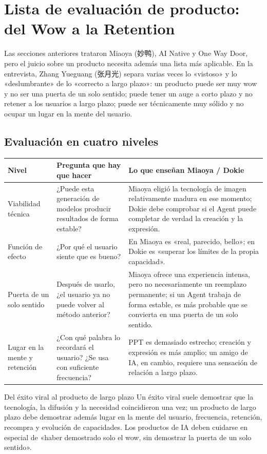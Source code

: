 \section{Lista de evaluación de producto: del Wow a la Retention}

Las secciones anteriores trataron Miaoya (妙鸭), AI Native y One Way Door, pero el juicio sobre un producto necesita además una lista más aplicable. En la entrevista, Zhang Yueguang (张月光) separa varias veces lo «vistoso» y lo «deslumbrante» de lo «correcto a largo plazo»: un producto puede ser muy wow y no ser una puerta de un solo sentido; puede tener un auge a corto plazo y no retener a los usuarios a largo plazo; puede ser técnicamente muy sólido y no ocupar un lugar en la mente del usuario.

\subsection{Evaluación en cuatro niveles}

\begin{longtable}{p{}p{}p{}}
\toprule
Nivel & Pregunta que hay que hacer & Lo que enseñan Miaoya / Dokie \\
\midrule
Viabilidad técnica & ¿Puede esta generación de modelos producir resultados de forma estable? & Miaoya eligió la tecnología de imagen relativamente madura en ese momento; Dokie debe comprobar si el Agent puede completar de verdad la creación y la expresión. \\
Función de efecto & ¿Por qué el usuario siente que es bueno? & En Miaoya es «real, parecido, bello»; en Dokie es «superar los límites de la propia capacidad». \\
Puerta de un solo sentido & Después de usarlo, ¿el usuario ya no puede volver al método anterior? & Miaoya ofrece una experiencia intensa, pero no necesariamente un reemplazo permanente; si un Agent trabaja de forma estable, es más probable que se convierta en una puerta de un solo sentido. \\
Lugar en la mente y retención & ¿Con qué palabra lo recordará el usuario? ¿Se usa con suficiente frecuencia? & PPT es demasiado estrecho; creación y expresión es más amplio; un amigo de IA, en cambio, requiere una sensación de relación a largo plazo. \\
\bottomrule
\end{longtable}

\begin{importantbox}{Del éxito viral al producto de largo plazo}
Un éxito viral suele demostrar que la tecnología, la difusión y la necesidad coincidieron una vez; un producto de largo plazo debe demostrar además lugar en la mente del usuario, frecuencia, retención, recompra y evolución de capacidades. Los productos de IA deben cuidarse en especial de «haber demostrado solo el wow, sin demostrar la puerta de un solo sentido».
\end{importantbox}

